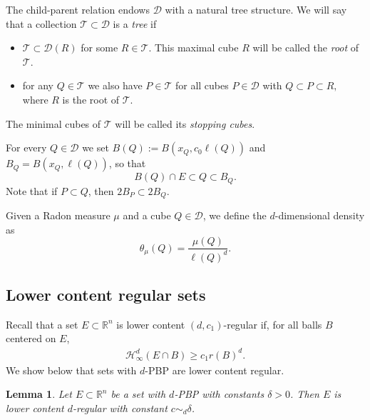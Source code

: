 \documentclass[11pt,reqno]{amsart}
\newtheorem{lemma}[theorem]{Lemma}
\theoremstyle{definition}
\theoremstyle{remark}
\numberwithin{equation}{section}
\newcommand{\R}{\mathbb{R}}
\newcommand{\hdc}{\mathcal{H}^d_\infty}
\newcommand{\DD}{\mathcal{D}}
\theoremstyle{theorem}
\theoremstyle{definition}
\theoremstyle{remark}
\numberwithin{equation}{section}
\begin{document}
	The child-parent relation endows $\DD$ with a natural tree structure. We will say that a collection $\mathcal{T}\subset\DD$ is a \emph{tree} if
\begin{itemize}
	\item $\mathcal{T}\subset \DD(R)$ for some $R\in\mathcal{T}$. This maximal cube $R$ will be called the \emph{root} of $\mathcal{T}$.
	\item for any $Q\in\mathcal{T}$ we also have $P\in\mathcal{T}$ for all cubes $P\in\DD$ with $Q\subset P\subset R,$ where $R$ is the root of $\mathcal{T}$.
\end{itemize}
	The minimal cubes of $\mathcal{T}$ will be called its \emph{stopping cubes}.
	
	For every $Q\in\DD$ we set $B(Q):= B(x_Q, c_0\ell(Q))$ and $B_Q = B(x_Q , \ell(Q))$, so that
	\begin{equation*}
		B(Q)\cap E \subset Q\subset B_Q.
	\end{equation*}
	Note that if $P\subset Q$, then $2B_P\subset 2B_Q$.
	
	Given a Radon measure $\mu$ and a cube $Q\in\mathcal{D}$, we define the $d$-dimensional density as
	\begin{equation*}
	\theta_\mu(Q)=\frac{\mu(Q)}{\ell(Q)^d}.
	\end{equation*}
		
	\subsection{Lower content regular sets}\label{subsec:LCR}
	
	Recall that a set $E \subset \R^n$ is lower content $(d, c_1)$-regular if, for all balls $B$ centered on $E$, 
	\begin{align*}
	\hdc(E \cap B) \geq c_1 r(B)^d. 
	\end{align*}
	We show below that sets with $d$-PBP are lower content regular.
	\begin{lemma}\label{l:low-reg-E}
		Let $E \subset \R^n$ be a set with $d$-PBP with constants $\delta>0$. Then $E$ is lower content $d$-regular with constant $c\sim_d \delta$.
	\end{lemma}
	
\end{document}

